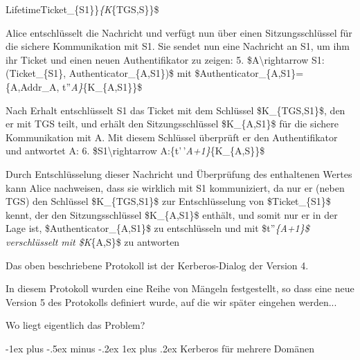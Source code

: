 \documentclass[a4paper]{article}
\makeatletter
\renewcommand{\subsubsection}{\@startsection{subsubsection}{3}{0mm}%
 {-1ex plus -.5ex minus -.2ex}%
 {1ex plus .2ex}%
 {\normalfont\small\bfseries}}
\makeatother
\begin{document}
\begin{multicols}{3}
\begin{itemize*}
            LifetimeTicket\_\{S1\}\}\emph{\{K}\{TGS,S\}\}\$
            \item
            Alice entschlüsselt die Nachricht und verfügt nun über einen
            Sitzungsschlüssel für die sichere Kommunikation mit S1. Sie sendet nun
            eine Nachricht an S1, um ihm ihr Ticket und einen neuen
            Authentifikator zu zeigen: 5. \$A\textbackslash rightarrow
            S1:(Ticket\_\{S1\}, Authenticator\_\{A,S1\})\$ mit
            \$Authenticator\_\{A,S1\}=\{A,Addr\_A, t''\emph{A\}}\{K\_\{A,S1\}\}\$
            \item
            Nach Erhalt entschlüsselt S1 das Ticket mit dem Schlüssel
            \$K\_\{TGS,S1\}\$, den er mit TGS teilt, und erhält den
            Sitzungsschlüssel \$K\_\{A,S1\}\$ für die sichere Kommunikation mit A.
            Mit diesem Schlüssel überprüft er den Authentifikator und antwortet A:
            6. \$S1\textbackslash rightarrow A:\{t'\,'\emph{A+1\}}\{K\_\{A,S\}\}\$
            \item
            Durch Entschlüsselung dieser Nachricht und Überprüfung des enthaltenen
            Wertes kann Alice nachweisen, dass sie wirklich mit S1 kommuniziert,
            da nur er (neben TGS) den Schlüssel \$K\_\{TGS,S1\}\$ zur
            Entschlüsselung von \$Ticket\_\{S1\}\$ kennt, der den
            Sitzungsschlüssel \$K\_\{A,S1\}\$ enthält, und somit nur er in der
            Lage ist, \$Authenticator\_\{A,S1\}\$ zu entschlüsseln und mit
            \$t''\emph{\{A+1\}\$ verschlüsselt mit \$K}\{A,S\}\$ zu antworten
            \item
            Das oben beschriebene Protokoll ist der Kerberos-Dialog der Version 4.

            \begin{itemize*}
                  \item In diesem Protokoll wurden eine Reihe von Mängeln festgestellt, so dass eine neue Version 5 des Protokolls definiert wurde, auf die wir später eingehen werden...
                  \item Wo liegt eigentlich das Problem?
            \end{itemize*}
      \end{itemize*}


      \subsubsection{Kerberos für mehrere
            Domänen}


\end{multicols}
\end{document}
